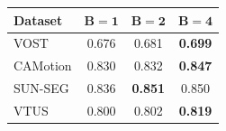  \label{tab:number_random_subsets}

\setlength{\tabcolsep}{4pt} \renewcommand{\arraystretch}{0.95} \begin{tabular}{lccc} \toprule \textbf{Dataset} & \(\mathbf{B=1}\) & \(\mathbf{B=2}\) & \(\mathbf{B=4}\) \\ \midrule VOST & 0.676 & 0.681 & \textbf{0.699} \\ CAMotion & 0.830 & 0.832 & \textbf{0.847} \\ SUN-SEG & 0.836 & \textbf{0.851} & 0.850 \\ VTUS & 0.800 & 0.802 & \textbf{0.819} \\ \bottomrule \end{tabular}%
